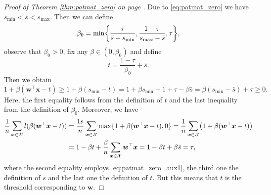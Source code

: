 \begin{proof}[Proof of Theorem \ref{thm:patmat_zero} on page \pageref{thm:patmat_zero}]
  Due to \eqref{eq:patmat_zero} we have $s_{\min} < \bar{s} < s_{\max}$. Then we can define
  \begin{equation*}
    \beta_0 = \min\Brac[c]{\frac{\tau}{\bar{s} - s_{\min}}, \frac{1-\tau}{s_{\max}-\bar{s}}, \tau},
  \end{equation*}
  observe that $\beta_0>0$, fix any $\beta\in(0,\beta_0)$ and define
  \begin{equation*}
    t = \frac{1-\tau}{\beta_0} + \bar{s}.
  \end{equation*}
  Then we obtain
  \begin{equation}\label{eq:patmat_zero_aux1}
    1+\beta(\bm{w}^\top\bm{x}-t) \ge 1+\beta(s_{\min}-t) = 1+\beta s_{\min}-1+\tau - \beta\bar{s} = \beta (s_{\min}-\bar{s})+\tau\ge 0.
  \end{equation}
  Here, the first equality follows from the definition of $t$ and the last inequality from the definition of $\beta_0$. Moreover, we have
  \begin{equation*}
    \begin{aligned}
      \frac{1}{n}\sum_{\bm{x} \in \Xc}l(\beta(\bm{w}^\top\bm{x}-t))
      & = \frac{1s}{n}\sum_{\bm{x} \in \Xc}\max\{1+\beta(\bm{w}^\top\bm{x}-t), 0\}
        = \frac{1}{n}\sum_{\bm{x} \in \Xc}\Brac{1+\beta(\bm{w}^\top\bm{x}-t)} \\
      & = 1-\beta t + \frac{\beta}{n}\sum_{\bm{x} \in \Xc}\bm{w}^\top\bm{x}
        = 1-\beta t + \beta\bar{s} = \tau,
    \end{aligned}
  \end{equation*}
  where the second equality employs \eqref{eq:patmat_zero_aux1}, the third one the definition of $\bar{s}$ and the last one the definition of $t$. But this means that $t$ is the threshold corresponding to $\bm{w}$.
  

\end{proof}
